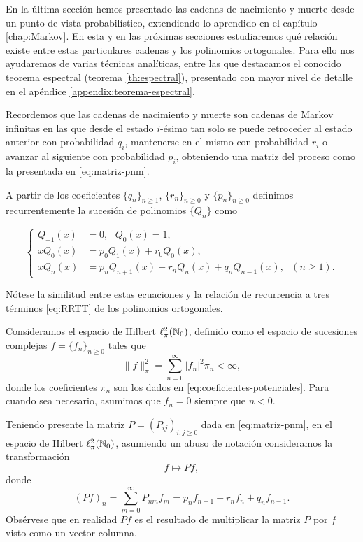     En la última sección hemos presentado las cadenas de nacimiento y muerte desde un punto de vista probabilístico, extendiendo lo aprendido en el capítulo \ref{chap:Markov}. En esta y en las próximas secciones estudiaremos qué relación existe entre estas particulares cadenas y los polinomios ortogonales. Para ello nos ayudaremos de varias técnicas analíticas, entre las que destacamos el conocido teorema espectral (teorema \ref{th:espectral}), presentado con mayor nivel de detalle en el apéndice \ref{appendix:teorema-espectral}.
    
    Recordemos que las cadenas de nacimiento y muerte son cadenas de Markov infinitas en las que desde el estado $i$-ésimo tan solo se puede retroceder al estado anterior con probabilidad $q_i$, mantenerse en el mismo con probabilidad $r_i$ o avanzar al siguiente con probabilidad $p_i$, obteniendo una matriz del proceso como la presentada en \eqref{eq:matriz-pnm}.

    A partir de los coeficientes $\{q_n\}_{n\geq 1}$, $\{r_n\}_{n\geq 0}$ y $\{p_n\}_{n\geq 0}$ definimos recurrentemente la sucesión de polinomios $\{Q_n\}$ como

    \begin{equation}
        \label{eq:polinomios-pnm}
        \left\{\begin{aligned}
            Q_{-1}(x) &= 0, \ \ \ Q_0(x)=1, \\
            xQ_0(x)&=p_0 Q_1(x) + r_0 Q_0(x), \\
            x Q_n(x)&= p_n Q_{n+1}(x) + r_n Q_n(x) + q_n Q_{n-1}(x), \ \ \ (n\geq 1).
        \end{aligned}\right.
    \end{equation}
    
    Nótese la similitud entre estas ecuaciones y la relación de recurrencia a tres términos \eqref{eq:RRTT} de los polinomios ortogonales. 

    Consideramos el espacio de Hilbert $\ell^2_\pi(\mathbb{N}_0)$, definido como el espacio de sucesiones complejas $f=\{f_n\}_{n\geq 0}$ tales que 
    $$
    \|f\|_\pi^2=\sum_{n=0}^\infty |f_n|^2\pi_n <\infty,
    $$
    donde los coeficientes $\pi_n$ son los dados en \eqref{eq:coeficientes-potenciales}. Para cuando sea necesario, asumimos que $f_n=0$ siempre que $n<0$.

    Teniendo presente la matriz $P=\left(P_{ij}\right)_{i,j\geq 0}$ dada en \eqref{eq:matriz-pnm}, en el espacio de Hilbert $\ell^2_\pi(\mathbb{N}_0)$, asumiendo un abuso de notación consideramos la transformación
    \begin{equation}
        \label{eq:operador-P}
        f \longmapsto Pf,
    \end{equation}
    donde
    $$
    (Pf)_n = \sum_{m=0}^\infty P_{nm} f_m = p_n f_{n+1} + r_n f_n + q_n f_{n-1}. 
    $$
    Obsérvese que en realidad $Pf$ es el resultado de multiplicar la matriz $P$ por $f$ visto como un vector columna.

